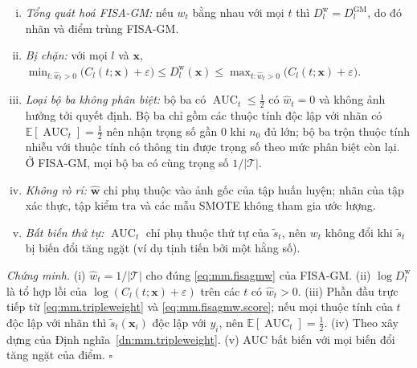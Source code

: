 \begin{md}\label{md:mm.fisagmw}
\begin{enumerate}[(i)]
  \item \emph{Tổng quát hoá FISA-GM:} nếu $w_t$ bằng nhau với mọi $t$ thì $D^{\mathrm w}_l = D^{\mathrm{GM}}_l$,
        do đó nhãn và điểm trùng FISA-GM.
  \item \emph{Bị chặn:} với mọi $l$ và $\mathbf{x}$,
        $\min_{t:\hat w_t>0} \bigl(C_l(t;\mathbf{x})+\varepsilon\bigr) \le D^{\mathrm w}_l(\mathbf{x})
        \le \max_{t:\hat w_t>0} \bigl(C_l(t;\mathbf{x})+\varepsilon\bigr)$.
  \item \emph{Loại bộ ba không phân biệt:} bộ ba có $\operatorname{AUC}_t\le\tfrac12$ có $\hat w_t=0$ và không ảnh
        hưởng tới quyết định. Bộ ba chỉ gồm các thuộc tính độc lập với nhãn có $\mathbb{E}[\operatorname{AUC}_t]=\tfrac12$
        nên nhận trọng số gần $0$ khi $n_0$ đủ lớn; bộ ba trộn thuộc tính nhiễu với thuộc tính có thông tin được
        trọng số theo mức phân biệt còn lại. Ở FISA-GM, mọi bộ ba có cùng trọng số $1/|\mathcal{T}|$.
  \item \emph{Không rò rỉ:} $\hat{\mathbf w}$ chỉ phụ thuộc vào ảnh gốc của tập huấn luyện; nhãn của tập xác
        thực, tập kiểm tra và các mẫu SMOTE không tham gia ước lượng.
  \item \emph{Bất biến thứ tự:} $\operatorname{AUC}_t$ chỉ phụ thuộc thứ tự của $\tilde s_t$, nên $w_t$ không đổi
        khi $\tilde s_t$ bị biến đổi tăng ngặt (ví dụ tịnh tiến bởi một hằng số).
\end{enumerate}
\end{md}
\noindent\emph{Chứng minh.} (i) $\hat w_t=1/|\mathcal{T}|$ cho đúng \eqref{eq:mm.fisagmw} của FISA-GM.
(ii) $\log D^{\mathrm w}_l$ là tổ hợp lồi của $\log(C_l(t;\mathbf{x})+\varepsilon)$ trên các $t$ có $\hat w_t>0$.
(iii) Phần đầu trực tiếp từ \eqref{eq:mm.tripleweight} và \eqref{eq:mm.fisagmw.score}; nếu mọi thuộc tính của
$t$ độc lập với nhãn thì $\tilde s_t(\mathbf{x}_i)$ độc lập với $y_i$, nên $\mathbb{E}[\operatorname{AUC}_t]=\tfrac12$.
(iv) Theo xây dựng của Định nghĩa~\ref{dn:mm.tripleweight}.
(v) AUC bất biến với mọi biến đổi tăng ngặt của điểm. \hfill$\square$

